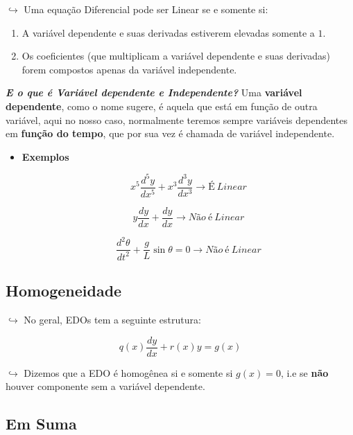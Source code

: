 \documentclass[]{article}
\providecommand{\tightlist}{%
  \setlength{\itemsep}{0pt}\setlength{\parskip}{0pt}}
\begin{document}
    \(\hookrightarrow\) Uma equação Diferencial pode ser Linear se e somente
    si:

    \begin{enumerate}
    \def\labelenumi{\arabic{enumi}.}
    \tightlist
    \item
      A variável dependente e suas derivadas estiverem elevadas somente a
      \(1\).
    \item
      Os coeficientes (que multiplicam a variável dependente e suas
      derivadas) forem compostos apenas da variável independente.
    \end{enumerate}

    \textbf{\emph{E o que é Variável dependente e Independente?}} Uma
    \textbf{variável dependente}, como o nome sugere, é aquela que está em
    função de outra variável, aqui no nosso caso, normalmente teremos sempre
    variáveis dependentes em \textbf{função do tempo}, que por sua vez é
    chamada de variável independente.

    \begin{itemize}
    \item
      \textbf{Exemplos}

      \[
        x^5 \frac{d^5 y}{dx^5} + x^3 \frac{d^3 y}{dx^3}  \rightarrow É \ Linear
        \]

      \[
        \boxed{y\frac{dy}{dx}} + \frac{dy}{dx} \rightarrow Não \ é \ Linear
        \]

      \[
        \frac{d^2 \theta}{dt^2} + \frac{g}{L} \boxed{\sin \theta} = 0 \rightarrow Não \ é \ Linear
        \]
    \end{itemize}

    \hypertarget{homogeneidade}{%
    \subsection{Homogeneidade}\label{homogeneidade}}

    \(\hookrightarrow\) No geral, EDOs tem a seguinte estrutura:

    \[
    q(x)\frac{dy}{dx} + r(x)y = g(x)
    \]

    \(\hookrightarrow\) Dizemos que a EDO é homogênea si e somente si
    \(g(x) = 0\), i.e se \textbf{não} houver componente sem a variável
    dependente.

  \hypertarget{em-suma}{%
  \subsection{Em Suma}\label{em-suma}}
\end{document}
